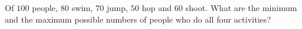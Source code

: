 Of $100$ people, $80$ swim, $70$ jump, $50$ hop and $60$ shoot. What are the minimum and the maximum possible numbers of people who do all four activities?
